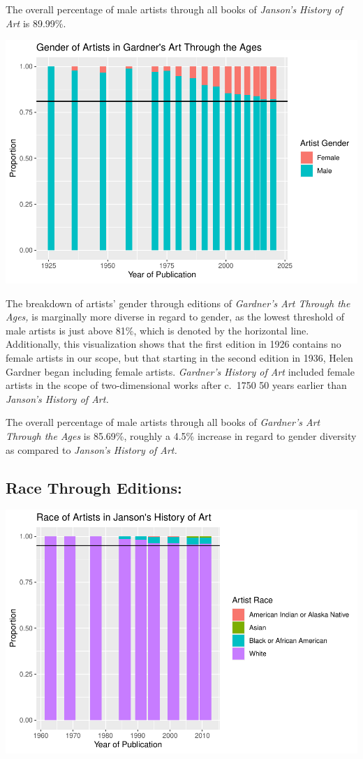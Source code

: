 \documentclass[
  letterpaper,
  DIV=11,
  numbers=noendperiod]{scrreprt}
\begin{document}
The overall percentage of male artists through all books of
\emph{Janson's History of Art} is 89.99\%.

\includegraphics{Chapter1/Chapter1_files/figure-pdf/gardnergenderthroughtime-1.pdf}

The breakdown of artists' gender through editions of \emph{Gardner's Art
Through the Ages,} is marginally more diverse in regard to gender, as
the lowest threshold of male artists is just above 81\%, which is
denoted by the horizontal line. Additionally, this visualization shows
that the first edition in 1926 contains no female artists in our scope,
but that starting in the second edition in 1936, Helen Gardner began
including female artists. \emph{Gardner's History of Art} included
female artists in the scope of two-dimensional works after c.~1750 50
years earlier than \emph{Janson's History of Art.}

The overall percentage of male artists through all books of
\emph{Gardner's Art Through the Ages} is 85.69\%, roughly a 4.5\%
increase in regard to gender diversity as compared to \emph{Janson's
History of Art.}

\hypertarget{race-through-editions}{%
\subsection{\texorpdfstring{\textbf{Race Through
Editions:}}{Race Through Editions:}}\label{race-through-editions}}

\includegraphics{Chapter1/Chapter1_files/figure-pdf/jansonracethroughtime-1.pdf}
\end{document}
